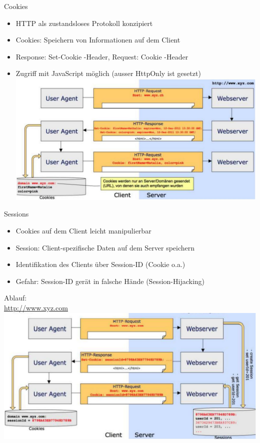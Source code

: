 \begin{definition}{Cookies}

\begin{itemize}
\item HTTP als zustandsloses Protokoll konzipiert
\item Cookies: Speichern von Informationen auf dem Client
\item Response: Set-Cookie -Header, Request: Cookie -Header
\item Zugriff mit JavaScript möglich (ausser HttpOnly ist gesetzt)\\
\includegraphics[width=\linewidth]{images/2024_12_29_858f09cde51177c71657g-31}
\end{itemize}
\end{definition}

\begin{definition}{Sessions}
\begin{itemize}
\item Cookies auf dem Client leicht manipulierbar
\item Session: Client-spezifische Daten auf dem Server speichern
\item Identifikation des Clients über Session-ID (Cookie o.a.)
\item Gefahr: Session-ID gerät in falsche Hände (Session-Hijacking)
\end{itemize}
\end{definition}
Ablauf:\\
\href{http://www.xyz.com}{http://www.xyz.com}\\
\includegraphics[width=\linewidth]{images/2024_12_29_858f09cde51177c71657g-31(1)}


